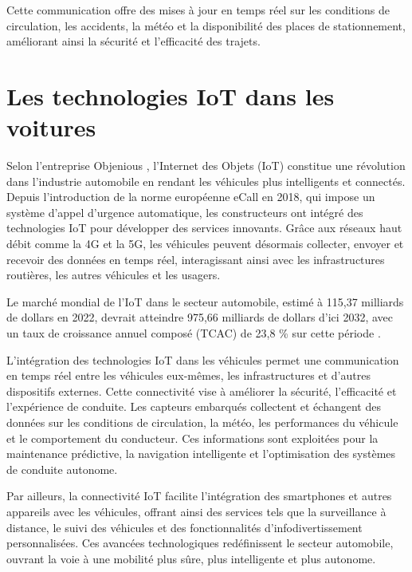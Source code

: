 \documentclass{article}
\begin{document}
Cette communication offre des mises à jour en temps réel sur les conditions de circulation, les accidents, la météo et la disponibilité des places de stationnement, améliorant ainsi la sécurité et l’efficacité des trajets\cite{joberty_blog}.\\



\newpage
\section{Les technologies IoT dans les voitures}

Selon l’entreprise Objenious \cite{noauthor_revolution_2025}, l’Internet des Objets (IoT) constitue une révolution dans l’industrie automobile en rendant les véhicules plus intelligents et connectés. Depuis l’introduction de la norme européenne eCall en 2018, qui impose un système d’appel d’urgence automatique, les constructeurs ont intégré des technologies IoT pour développer des services innovants. Grâce aux réseaux haut débit comme la 4G et la 5G, les véhicules peuvent désormais collecter, envoyer et recevoir des données en temps réel, interagissant ainsi avec les infrastructures routières, les autres véhicules et les usagers.

Le marché mondial de l’IoT dans le secteur automobile, estimé à 115,37 milliards de dollars en 2022, devrait atteindre 975,66 milliards de dollars d’ici 2032, avec un taux de croissance annuel composé (TCAC) de 23,8 \% sur cette période \cite{noauthor_taille_2023}.

L’intégration des technologies IoT dans les véhicules permet une communication en temps réel entre les véhicules eux-mêmes, les infrastructures et d’autres dispositifs externes. Cette connectivité vise à améliorer la sécurité, l’efficacité et l’expérience de conduite. Les capteurs embarqués collectent et échangent des données sur les conditions de circulation, la météo, les performances du véhicule et le comportement du conducteur. Ces informations sont exploitées pour la maintenance prédictive, la navigation intelligente et l’optimisation des systèmes de conduite autonome.

Par ailleurs, la connectivité IoT facilite l’intégration des smartphones et autres appareils avec les véhicules, offrant ainsi des services tels que la surveillance à distance, le suivi des véhicules et des fonctionnalités d’infodivertissement personnalisées. Ces avancées technologiques redéfinissent le secteur automobile, ouvrant la voie à une mobilité plus sûre, plus intelligente et plus autonome.
\end{document}
